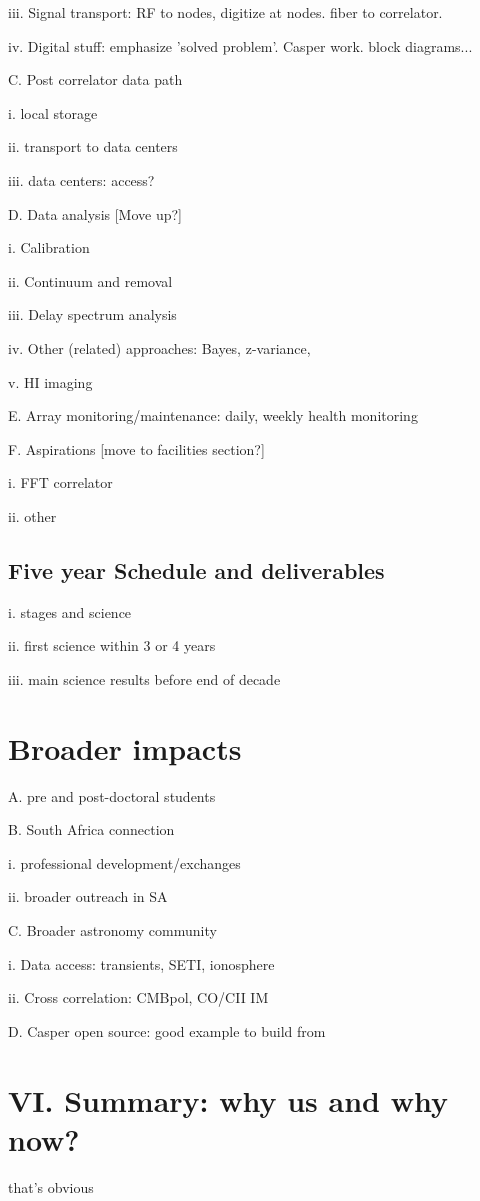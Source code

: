\documentclass[preprint]{aastex}
\begin{document}
iii. Signal transport: RF to nodes, digitize at nodes. fiber to correlator. 

iv. Digital stuff: emphasize 'solved problem'. Casper work. block diagrams...

C. Post correlator data path

i. local storage

ii. transport to data centers

iii. data centers: access? 

D. Data analysis [Move up?]

i. Calibration 

ii. Continuum and removal

iii. Delay spectrum analysis

iv. Other (related) approaches: Bayes, z-variance,

v. HI imaging

E. Array monitoring/maintenance: daily, weekly health monitoring

F. Aspirations [move to facilities section?]

i. FFT correlator

ii. other

\subsection{Five year Schedule and deliverables} %

i. stages and science

ii. first science within 3 or 4 years

iii. main science results before end of decade


\section{Broader impacts} %

A. pre and post-doctoral students

B. South Africa connection

i. professional development/exchanges

ii. broader outreach in SA

C. Broader astronomy community

i. Data access: transients, SETI, ionosphere

ii. Cross correlation: CMBpol, CO/CII IM

D. Casper open source: good example to build from


\section{VI. Summary: why us and why now?} %

that's obvious


\clearpage
\setcounter{page}{1}
\thispagestyle{empty}
%
%


\end{document}

